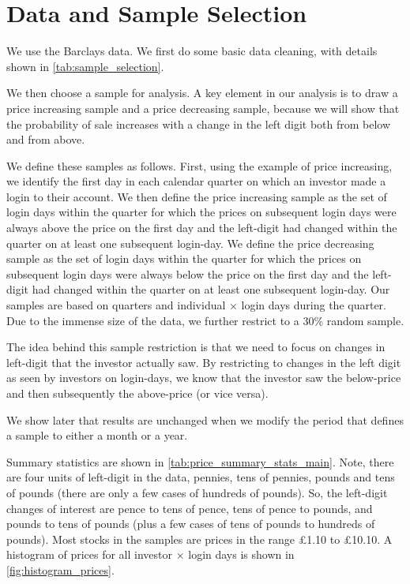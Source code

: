 \section{Data and Sample Selection}

We use the Barclays data. We first do some basic data cleaning, with details shown in \ref{tab:sample_selection}. 

We then choose a sample for analysis. A key element in our analysis is to draw a price increasing sample and a price decreasing sample, because we will show that the probability of sale increases with a change in the left digit both from below and from above. 

We define these samples as follows. First, using the example of price increasing, we identify the first day in each calendar quarter on which an investor made a login to their account. We then define the price increasing sample as the set of login days within the quarter for which the prices on subsequent login days were always above the price on the first day and the left-digit had changed within the quarter on at least one subsequent login-day. We define the price decreasing sample as the set of login days within the quarter for which the prices on subsequent login days were always below the price on the first day and the left-digit had changed within the quarter on at least one subsequent login-day. Our samples are based on quarters and individual $\times$  login days during the quarter. Due to the immense size of the data, we further restrict to a 30\% random sample.

The idea behind this sample restriction is that we need to focus on changes in left-digit that the investor actually saw. By restricting to changes in the left digit as seen by investors on login-days, we know that the investor saw the below-price and then subsequently the above-price (or vice versa).

We show later that results are unchanged when we modify the period that defines a sample to either a month or a year. 

Summary statistics are shown in \ref{tab:price_summary_stats_main}. Note, there are four units of left-digit in the data, pennies, tens of pennies, pounds and tens of pounds (there are only a few cases of hundreds of pounds). So, the left-digit changes of interest are pence to tens of pence, tens of pence to pounds, and pounds to tens of pounds (plus a few cases of tens of pounds to hundreds of pounds). Most stocks in the samples are prices in the range \pounds1.10 to \pounds10.10. A histogram of prices for all investor $\times$ login days is shown in \ref{fig:histogram_prices}.


